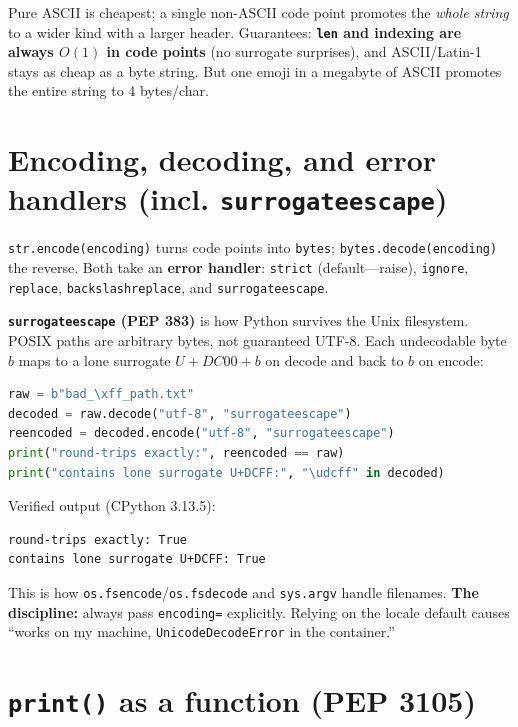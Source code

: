 Pure ASCII is cheapest; a single non-ASCII code point promotes the \emph{whole string} to a wider
kind with a larger header. Guarantees: \textbf{\texttt{len} and indexing are always $O(1)$ in code
points} (no surrogate surprises), and ASCII/Latin-1 stays as cheap as a byte string. But one emoji
in a megabyte of ASCII promotes the entire string to 4 bytes/char.

\section{Encoding, decoding, and error handlers (incl. \texttt{surrogateescape})}

\texttt{str.encode(encoding)} turns code points into \texttt{bytes}; \texttt{bytes.decode(encoding)}
the reverse. Both take an \textbf{error handler}: \texttt{strict} (default---raise),
\texttt{ignore}, \texttt{replace}, \texttt{backslashreplace}, and \texttt{surrogateescape}.

\textbf{\texttt{surrogateescape} (PEP 383)} is how Python survives the Unix filesystem. POSIX
paths are arbitrary bytes, not guaranteed UTF-8. Each undecodable byte $b$ maps to a lone
surrogate $U{+}DC00 + b$ on decode and back to $b$ on encode:

\begin{lstlisting}[language=Python, caption={surrogateescape round-trips arbitrary bytes through a str losslessly.}]
raw = b"bad_\xff_path.txt"
decoded = raw.decode("utf-8", "surrogateescape")
reencoded = decoded.encode("utf-8", "surrogateescape")
print("round-trips exactly:", reencoded == raw)
print("contains lone surrogate U+DCFF:", "\udcff" in decoded)
\end{lstlisting}

Verified output (CPython 3.13.5):

\begin{lstlisting}[caption={Output}]
round-trips exactly: True
contains lone surrogate U+DCFF: True
\end{lstlisting}

This is how \texttt{os.fsencode}/\texttt{os.fsdecode} and \texttt{sys.argv} handle filenames.
\textbf{The discipline:} always pass \texttt{encoding=} explicitly. Relying on the locale default
causes ``works on my machine, \texttt{UnicodeDecodeError} in the container.''

\section{\texttt{print()} as a function (PEP 3105)}

